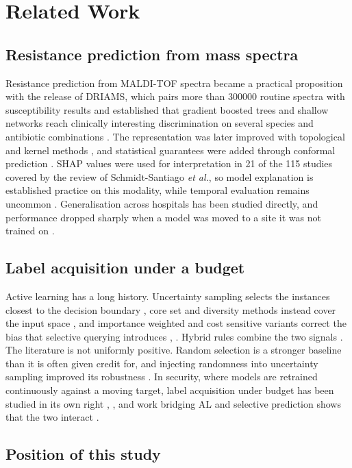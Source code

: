 \documentclass[conference,a4paper]{IEEEtran}
\begin{document}
\section{Related Work}

\subsection{Resistance prediction from mass spectra}

Resistance prediction from MALDI-TOF spectra became a practical proposition with the release of DRIAMS, which pairs more than 300000 routine spectra with susceptibility results and established that gradient boosted trees and shallow networks reach clinically interesting discrimination on several species and antibiotic combinations \cite{r2}. The representation was later improved with topological and kernel methods \cite{r5}, and statistical guarantees were added through conformal prediction \cite{r7}. SHAP values were used for interpretation in 21 of the 115 studies covered by the review of Schmidt-Santiago \textit{et al.}, so model explanation is established practice on this modality, while temporal evaluation remains uncommon \cite{r4}. Generalisation across hospitals has been studied directly, and performance dropped sharply when a model was moved to a site it was not trained on \cite{r6}.

\subsection{Label acquisition under a budget}

Active learning has a long history. Uncertainty sampling selects the instances closest to the decision boundary \cite{r10}, core set and diversity methods instead cover the input space \cite{r11}, and importance weighted and cost sensitive variants correct the bias that selective querying introduces \cite{r12}, \cite{r13}. Hybrid rules combine the two signals \cite{r14}. The literature is not uniformly positive. Random selection is a stronger baseline than it is often given credit for, and injecting randomness into uncertainty sampling improved its robustness \cite{r15}. In security, where models are retrained continuously against a moving target, label acquisition under budget has been studied in its own right \cite{r9}, \cite{r16}, and work bridging AL and selective prediction shows that the two interact \cite{r8}.

\subsection{Position of this study}
\end{document}

